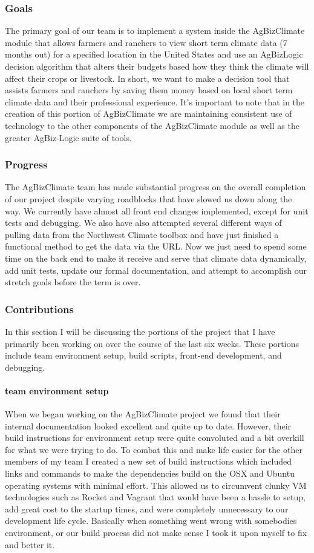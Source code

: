 \documentclass[onecolumn, draftclsnofoot,10pt, compsoc]{article}
\begin{document}
	\subsubsection{Goals}
        The primary goal of our team is to implement a system inside the AgBizClimate module that allows farmers and ranchers to view short term climate data (7 months out) for a specified location in the United States and use an AgBizLogic decision algorithm that alters their budgets based how they think the climate will affect their crops or livestock. In short, we want to make a decision tool that assists farmers and ranchers by saving them money based on local short term climate data and their professional experience. It's important to note that in the creation of this portion of AgBizClimate we are maintaining consistent use of technology to the other components of the AgBizClimate module as well as the greater AgBiz-Logic suite of tools.
        \subsubsection{Progress}
	The AgBizClimate team has made substantial progress on the overall completion of our project despite varying roadblocks that have slowed us down along the way. We currently have almost all front end changes implemented, except for unit tests and debugging. We also have also attempted several different ways of pulling data from the Northwest Climate toolbox and have just finished a functional method to get the data via the URL. Now we just need to spend some time on the back end to make it receive and serve that climate data dynamically, add unit tests, update our formal documentation, and attempt to accomplish our stretch goals before the term is over.
	\subsubsection{Contributions}
	In this section I will be discussing the portions of the project that I have primarily been working on over the course of the last six weeks. These portions include team environment setup, build scripts, front-end development, and debugging.
	\paragraph{team environment setup}
        When we began working on the AgBizClimate project we found that their internal documentation looked excellent and quite up to date. However, their build instructions for environment setup were quite convoluted and a bit overkill for what we were trying to do. To combat this and make life easier for the other members of my team I created a new set of build instructions which included links and commands to make the dependencies build on the OSX and Ubuntu operating systems with minimal effort. This allowed us to circumvent clunky VM technologies such as Rocket and Vagrant that would have been a hassle to setup, add great cost to the startup times, and were completely unnecessary to our development life cycle. Basically when something went wrong with somebodies environment, or our build process did not make sense I took it upon myself to fix and better it.
\end{document}
